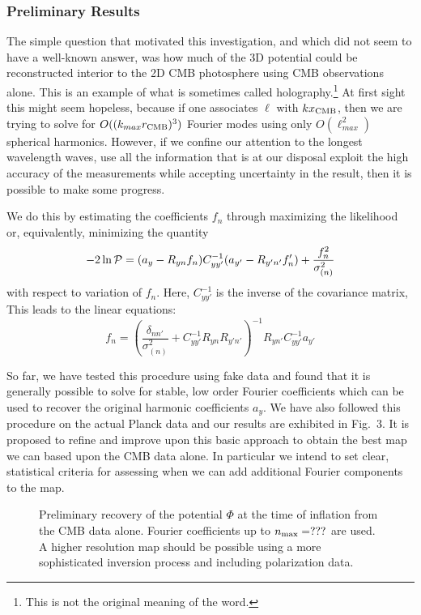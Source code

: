 \documentclass[psfig,11pt]{article}
\begin{document}
\subsubsection{Preliminary Results}
The simple question that motivated this investigation, and which did not seem to have a well-known answer, was how much of the 3D potential could be reconstructed interior to the 2D CMB photosphere using CMB observations alone. This is an example of what is sometimes called holography.\footnote{This is not the original meaning of the word.}  At first sight this might seem hopeless, because if one associates $\ell$ with $kx_{\rm CMB}$, then we are trying to solve for $O((k_{max}r_{\rm CMB})^3)$ Fourier modes using only $O(\ell_{max}^2)$ spherical harmonics. However, if we confine our attention to the longest wavelength waves, use all the information that is at our disposal exploit the high accuracy of the measurements while accepting uncertainty in the result, then it is possible to make some progress.

We do this by estimating the coefficients $f_n$ through maximizing the likelihood or, equivalently, minimizing the quantity 
\begin{equation}
-2\ln{\cal P}=(a_y-R_{yn}f_n)C_{yy'}^{-1}(a_{y'}-R_{y'n'}f_n')+\frac{f_n^2}{\sigma_{(n)}^2}
\end{equation}
with respect to variation of $f_n$. Here, $C_{yy'}^{-1}$ is the inverse of the covariance matrix, This leads to the linear equations:
\begin{equation}
f_n=\left(\frac{\delta_{nn'}}{\sigma_{(n)}^2}+C_{yy'}^{-1}R_{yn}R_{y'n'}\right)^{-1}R_{yn'}C_{yy'}^{-1}a_{y'}
\end{equation}

So far, we have tested this procedure using fake data and found that it is generally possible to solve for stable, low order Fourier coefficients which can be used to recover the original harmonic coefficients $a_y$. We have also followed this procedure on the actual Planck data and our results are exhibited in Fig.~3. It is proposed to refine and improve upon this basic approach to obtain the best map we can based upon the CMB data alone. In particular we intend to set clear, statistical criteria for assessing when we can add additional Fourier components to the map. 
\begin{figure}[t]
\centering
\caption{Preliminary recovery of the potential $\Phi$ at the time of inflation from the CMB data alone. Fourier coefficients up to $n_{\rm max}=???$ are used. A higher resolution map should be possible using a more sophisticated inversion process and including polarization data.}
\end{figure}
\end{document}
